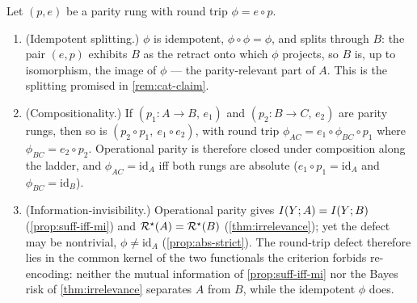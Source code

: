 \begin{theorem}
\label{thm:retraction}
Let $(p,e)$ be a parity rung with round trip $\phi=e\circ p$.
\begin{enumerate}
  \item[(i)] \textup{(Idempotent splitting.)} $\phi$ is idempotent,
    $\phi\circ\phi=\phi$, and splits through $B$: the pair $(e,p)$ exhibits $B$
    as the retract onto which $\phi$ projects, so $B$ is, up to isomorphism, the
    image of $\phi$ --- the parity-relevant part of $A$. This is the splitting
    promised in \cref{rem:cat-claim}.
  \item[(ii)] \textup{(Compositionality.)} If $(p_1:A\to B,\,e_1)$ and
    $(p_2:B\to C,\,e_2)$ are parity rungs, then so is
    $(p_2\circ p_1,\ e_1\circ e_2)$, with round trip
    $\phi_{AC}=e_1\circ\phi_{BC}\circ p_1$ where $\phi_{BC}=e_2\circ p_2$.
    Operational parity is therefore closed under composition along the ladder,
    and $\phi_{AC}=\mathrm{id}_A$ iff both rungs are absolute
    ($e_1\circ p_1=\mathrm{id}_A$ and $\phi_{BC}=\mathrm{id}_B$).
  \item[(iii)] \textup{(Information-invisibility.)} Operational parity gives
    $I(Y ; A)=I(Y ; B)$ (\cref{prop:suff-iff-mi}) and
    $\mathcal{R}^{\star}(A)=\mathcal{R}^{\star}(B)$ (\cref{thm:irrelevance}); yet the defect may
    be nontrivial, $\phi\ne\mathrm{id}_A$ (\cref{prop:abs-strict}). The
    round-trip defect therefore lies in the common kernel of the two functionals
    the criterion forbids re-encoding: neither the mutual information of
    \cref{prop:suff-iff-mi} nor the Bayes risk of \cref{thm:irrelevance}
    separates $A$ from $B$, while the idempotent $\phi$ does.
\end{enumerate}
\end{theorem}

